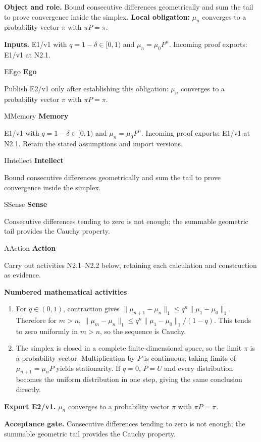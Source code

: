 \documentclass[preprint,12pt,aps,pra,showkeys,amsmath,amssymb,superscriptaddress,floatfix]{revtex4-2}
\theoremstyle{definition}
\theoremstyle{remark}
\newcommand{\mmfaculty}[3]{%
 \begin{mmfacultybox}{#1}{#2}
 {\sffamily\bfseries\color{MMBlue}#2}\par\smallskip #3
 \end{mmfacultybox}}
\newcommand{\field}[2]{\par\smallskip\noindent\textbf{#1.} #2\par}
\begin{document}
\field{Object and role}{Bound consecutive differences geometrically and sum the tail to prove
convergence inside the simplex. \textbf{Local obligation:} \(\mu_n\)
converges to a probability vector \(\pi\) with \(\pi P=\pi\).}

\field{Inputs}{E1/v1 with \(q=1-\delta\in[0,1)\) and \(\mu_n=\mu_0P^n\). Incoming proof
exports: E1/v1 at N2.1.}

\mmfaculty{E}{Ego}{Publish E2/v1 only after establishing this obligation: \(\mu_n\)
converges to a probability vector \(\pi\) with \(\pi P=\pi\).}

\mmfaculty{M}{Memory}{E1/v1 with \(q=1-\delta\in[0,1)\) and \(\mu_n=\mu_0P^n\). Incoming proof
exports: E1/v1 at N2.1. Retain the stated assumptions and import
versions.}

\mmfaculty{I}{Intellect}{Bound consecutive differences geometrically and sum the tail to prove
convergence inside the simplex.}

\mmfaculty{S}{Sense}{Consecutive differences tending to zero is not enough; the summable
geometric tail provides the Cauchy property.}

\mmfaculty{A}{Action}{Carry out activities N2.1--N2.2 below, retaining each calculation and
construction as evidence.}

\smallskip\noindent\textbf{Numbered mathematical activities}

\begin{enumerate}[label=N2.\arabic*,leftmargin=3.4em]

\item For \(q\in(0,1)\), contraction gives
\(\|\mu_{n+1}-\mu_n\|_1\le q^n\|\mu_1-\mu_0\|_1\). Therefore for
\(m>n\), \(\|\mu_m-\mu_n\|_1\le q^n\|\mu_1-\mu_0\|_1/(1-q)\). This tends
to zero uniformly in \(m>n\), so the sequence is Cauchy.

\item The simplex is closed in a complete finite-dimensional space, so the
limit \(\pi\) is a probability vector. Multiplication by \(P\) is
continuous; taking limits of \(\mu_{n+1}=\mu_nP\) yields stationarity.
If \(q=0\), \(P=U\) and every distribution becomes the uniform
distribution in one step, giving the same conclusion directly.

\end{enumerate}

\field{Export E2/v1}{\(\mu_n\) converges to a probability vector \(\pi\) with \(\pi P=\pi\).}

\field{Acceptance gate}{Consecutive differences tending to zero is not enough; the summable
geometric tail provides the Cauchy property.}
\end{document}
